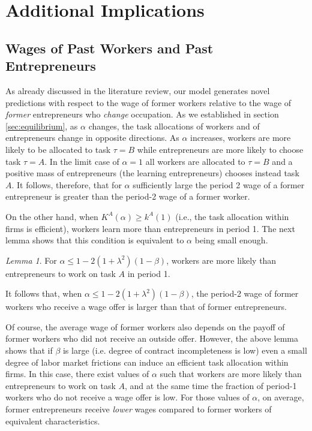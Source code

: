 \documentclass[12pt,american]{paper}
\theoremstyle{remark}
\newtheorem{lemma}{Lemma}
\begin{document}
\section{Additional Implications}\label{sec:implications}

\subsection{Wages of Past Workers and Past Entrepreneurs}\label{sec:wages of past workers vs entrepreneurs}

As already discussed in the literature review, our model generates novel predictions with respect to the wage of former workers relative to the wage of \textit{former} entrepreneurs who \textit{change} occupation.  As we established in section \ref{sec:equilibrium}, as $\alpha$ changes, the task allocations of workers and of entrepreneurs change in opposite directions. As $\alpha$ increases, workers are more likely to be allocated to task $\tau=B$ while entrepreneurs are more likely to choose task $\tau=A$.  In the limit case of $\alpha=1$ all workers are allocated to $\tau=B$ and a positive mass of entrepreneurs (the learning entrepreneurs) chooses instead task $A$. It follows, therefore, that for $\alpha$ sufficiently large the period 2 wage of a former entrepreneur is greater than the period-2 wage of a former worker. %


On the other hand, when $K^A(\alpha)\geq k^A(1)$ (i.e., the task allocation within firms is efficient), workers learn more than entrepreneurs in period 1. The next lemma shows that this condition is equivalent to $\alpha$ being small enough.
\begin{lemma}\label{wages-general-model}
For $\alpha\leq 1- 2(1+\lambda^2)(1-\beta)$, workers are more likely than entrepreneurs to work on task $A$ in period 1.
\end{lemma}%
\noindent 
It follows that, when $\alpha\leq 1- 2(1+\lambda^2)(1-\beta)$, the period-2 wage of former workers who receive a wage offer is larger than that of former entrepreneurs.

Of course, the average wage of former workers also depends on the payoff of former workers who did not receive an outside offer. However, the above lemma shows that if $\beta$ is large (i.e. degree of contract incompleteness is low) even a small degree of labor market frictions can induce an efficient task allocation within firms. In this case, there exist values of $\alpha$ such that workers are more likely than entrepreneurs to work on task $A$, and at the same time the fraction of period-1 workers who do not receive a wage offer is low. For those values of $\alpha$, on average, former entrepreneurs  receive \textit{lower} wages compared to former workers of equivalent characteristics.
% 
\end{document}
